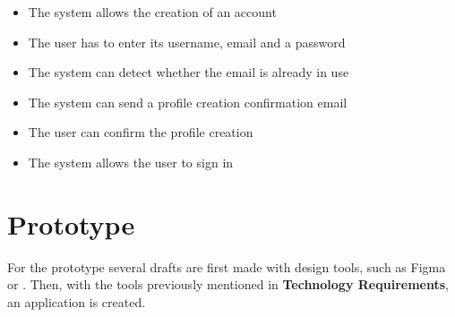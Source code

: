 \documentclass{scrreprt}
\begin{document}
\begin{itemize}
    \item The system allows the creation of an account
    \item The user has to enter its username, email and a password
    \item The system can detect whether the email is already in use
    \item The system can send a profile creation confirmation email
    \item The user can confirm the profile creation
    \item The system allows the user to sign in
\end{itemize}

\section{Prototype}

For the prototype several drafts are first made with design tools, such as Figma or . Then,
with the tools previously mentioned in \textbf{Technology Requirements}, an application is created.



\end{document}
